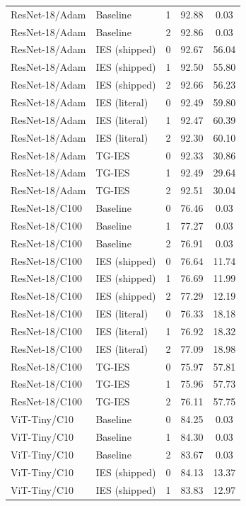 \documentclass{article}
\newcommand{\win}[1]{\cellcolor{tgwin}#1}
\newcommand{\lose}[1]{\cellcolor{tglose}#1}
\theoremstyle{plain}
\theoremstyle{definition}
\theoremstyle{remark}
\begin{document}
\begin{longtable}{llccc}
ResNet-18/Adam & Baseline & 1 & 92.88 & 0.03 \\
ResNet-18/Adam & Baseline & 2 & 92.86 & 0.03 \\
ResNet-18/Adam & IES (shipped) & 0 & 92.67 & 56.04 \\
ResNet-18/Adam & IES (shipped) & 1 & 92.50 & 55.80 \\
ResNet-18/Adam & IES (shipped) & 2 & 92.66 & 56.23 \\
ResNet-18/Adam & IES (literal) & 0 & 92.49 & 59.80 \\
ResNet-18/Adam & IES (literal) & 1 & 92.47 & 60.39 \\
ResNet-18/Adam & IES (literal) & 2 & 92.30 & 60.10 \\
ResNet-18/Adam & TG-IES & 0 & \lose{92.33} & \lose{30.86} \\
ResNet-18/Adam & TG-IES & 1 & \lose{92.49} & \lose{29.64} \\
ResNet-18/Adam & TG-IES & 2 & \lose{92.51} & \lose{30.04} \\
ResNet-18/C100 & Baseline & 0 & 76.46 & 0.03 \\
ResNet-18/C100 & Baseline & 1 & 77.27 & 0.03 \\
ResNet-18/C100 & Baseline & 2 & 76.91 & 0.03 \\
ResNet-18/C100 & IES (shipped) & 0 & 76.64 & 11.74 \\
ResNet-18/C100 & IES (shipped) & 1 & 76.69 & 11.99 \\
ResNet-18/C100 & IES (shipped) & 2 & 77.29 & 12.19 \\
ResNet-18/C100 & IES (literal) & 0 & 76.33 & 18.18 \\
ResNet-18/C100 & IES (literal) & 1 & 76.92 & 18.32 \\
ResNet-18/C100 & IES (literal) & 2 & 77.09 & 18.98 \\
ResNet-18/C100 & TG-IES & 0 & \lose{75.97} & \win{57.81} \\
ResNet-18/C100 & TG-IES & 1 & \lose{75.96} & \win{57.73} \\
ResNet-18/C100 & TG-IES & 2 & \lose{76.11} & \win{57.75} \\
ViT-Tiny/C10 & Baseline & 0 & 84.25 & 0.03 \\
ViT-Tiny/C10 & Baseline & 1 & 84.30 & 0.03 \\
ViT-Tiny/C10 & Baseline & 2 & 83.67 & 0.03 \\
ViT-Tiny/C10 & IES (shipped) & 0 & 84.13 & 13.37 \\
ViT-Tiny/C10 & IES (shipped) & 1 & 83.83 & 12.97 \\

\end{longtable}
\end{document}

